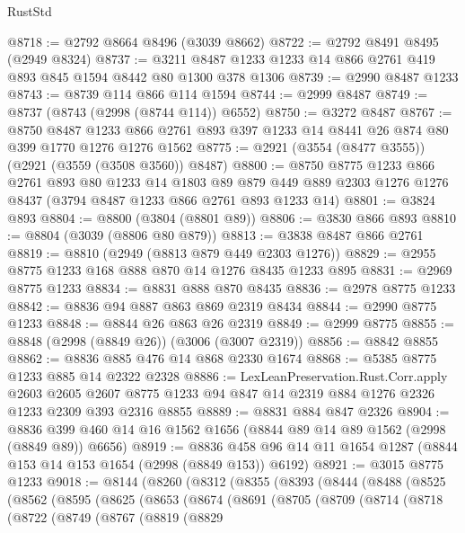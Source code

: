\begin{lexlean}{RustStd}
\begin{coremodule}
@8718 := @2792 @8664 @8496 (@3039 @8662)
@8722 := @2792 @8491 @8495 (@2949 @8324)
@8737 := @3211 @8487 @1233 @1233 @14 @866 @2761 @419 @893 @845 @1594 @8442 @80 @1300 @378 @1306
@8739 := @2990 @8487 @1233
@8743 := @8739 @114 @866 @114 @1594
@8744 := @2999 @8487
@8749 := @8737 (@8743 (@2998 (@8744 @114)) @6552)
@8750 := @3272 @8487
@8767 := @8750
    @8487
    @1233
    @866
    @2761
    @893
    @397
    @1233
    @14
    @8441
    @26
    @874
    @80
    @399
    @1770
    @1276
    @1276
    @1562
@8775 := @2921 (@3554 (@8477 @3555)) (@2921 (@3559 (@3508 @3560)) @8487)
@8800 := @8750
    @8775
    @1233
    @866
    @2761
    @893
    @80
    @1233
    @14
    @1803
    @89
    @879
    @449
    @889
    @2303
    @1276
    @1276
    @8437
    (@3794 @8487 @1233 @866 @2761 @893 @1233 @14)
@8801 := @3824 @893
@8804 := @8800 (@3804 (@8801 @89))
@8806 := @3830 @866 @893
@8810 := @8804 (@3039 (@8806 @80 @879))
@8813 := @3838 @8487 @866 @2761
@8819 := @8810 (@2949 (@8813 @879 @449 @2303 @1276))
@8829 := @2955 @8775 @1233 @168 @888 @870 @14 @1276 @8435 @1233 @895
@8831 := @2969 @8775 @1233
@8834 := @8831 @888 @870 @8435
@8836 := @2978 @8775 @1233
@8842 := @8836 @94 @887 @863 @869 @2319 @8434
@8844 := @2990 @8775 @1233
@8848 := @8844 @26 @863 @26 @2319
@8849 := @2999 @8775
@8855 := @8848 (@2998 (@8849 @26)) (@3006 (@3007 @2319))
@8856 := @8842 @8855
@8862 := @8836 @885 @476 @14 @868 @2330 @1674
@8868 := @5385 @8775 @1233 @885 @14 @2322 @2328
@8886 := LexLeanPreservation.Rust.Corr.apply
    @2603
    @2605
    @2607
    @8775
    @1233
    @94
    @847
    @14
    @2319
    @884
    @1276
    @2326
    @1233
    @2309
    @393
    @2316
    @8855
@8889 := @8831 @884 @847 @2326
@8904 := @8836 @399 @460 @14 @16 @1562 @1656 (@8844 @89 @14 @89 @1562 (@2998 (@8849 @89)) @6656)
@8919 := @8836 @458 @96 @14 @11 @1654 @1287 (@8844 @153 @14 @153 @1654 (@2998 (@8849 @153)) @6192)
@8921 := @3015 @8775 @1233
@9018 := @8144
    (@8260
      (@8312
        (@8355
          (@8393
            (@8444
              (@8488
                (@8525
                  (@8562
                    (@8595
                      (@8625
                        (@8653
                          (@8674
                            (@8691
                              (@8705
                                (@8709
                                  (@8714
                                    (@8718
                                      (@8722
                                        (@8749
                                          (@8767
                                            (@8819
                                              (@8829

\end{coremodule}
\end{lexlean}

